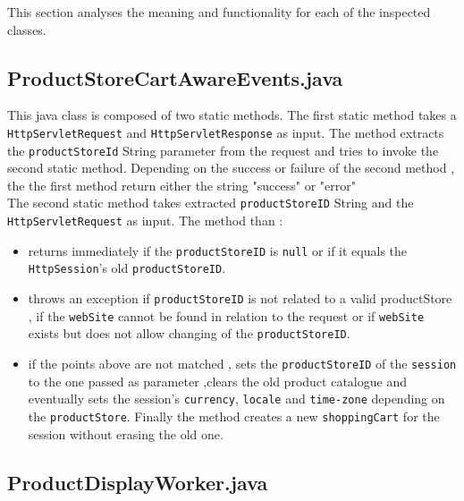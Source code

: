 This section analyses the meaning and functionality for each of the inspected classes.\\ 
\subsection{ProductStoreCartAwareEvents.java}
\label{sub:PSCAE}
This java class is composed of two static methods.
The first static method takes a \texttt{HttpServletRequest} and \texttt{HttpServletResponse} as input. The method extracts the \texttt{productStoreId} String parameter from the request and tries to invoke the second static method. Depending on the success or failure of the second method ,	the the first method return either the string "success" or "error"\\
The second static method takes extracted \texttt{productStoreID} String and the \texttt{HttpServletRequest} as input. The method than :
\begin{itemize}
\item returns immediately  if the \texttt{productStoreID} is \texttt{null} or if it equals the \texttt{HttpSession}'s old \texttt{productStoreID}.
\item throws an exception if \texttt{productStoreID} is not related to a valid productStore , if the \texttt{webSite} cannot be found in relation to the request or if \texttt{webSite} exists but does not allow changing of the \texttt{productStoreID}.
\item if the points above are not matched , sets the \texttt{productStoreID} of the \texttt{session} to the one passed as parameter ,clears the old product catalogue and  eventually sets the session's \texttt{currency}, \texttt{locale} and \texttt{time-zone} depending on the \texttt{productStore}. Finally the method creates a new \texttt{shoppingCart} for the session without erasing the old one.
\end{itemize} 
\clearpage
\subsection{ProductDisplayWorker.java}
\label{sub:PDW}